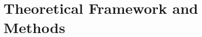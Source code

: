 \documentclass[12pt]{uthesis-v12}  %
\begin{document}
\chapter{Theoretical Framework and Methods}












% 
% 
% 
% 
% 
% 
% 
% 
% 
% 
% 
\end{document}
